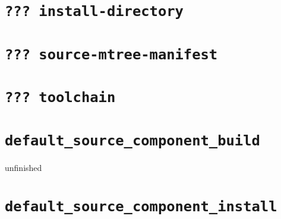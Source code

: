 \section{\texttt{??? install-directory}}\label{api:install-directory}

\section{\texttt{??? source-mtree-manifest}}\label{api:source-mtree-manifest}

\section{\texttt{??? toolchain}}\label{api:toolchain}

\section{\texttt{default\_source\_component\_build}}\label{api:default-source-component-build}

unfinished

\section{\texttt{default\_source\_component\_install}}\label{api:default-source-component-install}
